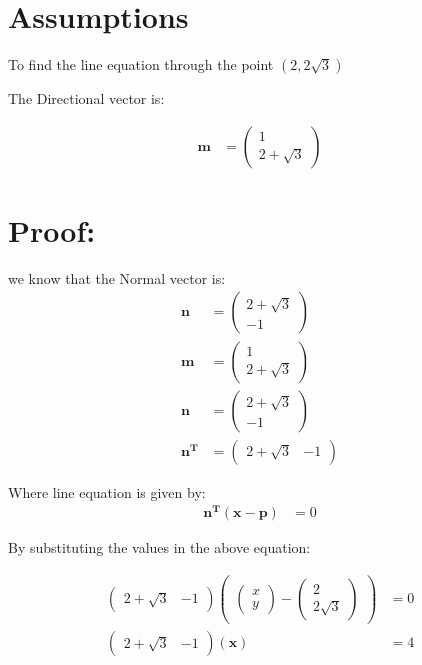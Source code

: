 \documentclass[journal,10pt,twocolumn]{article}
\let\vec\mathbf
\newcommand{\myvec}[1]{\ensuremath{\begin{pmatrix}#1\end{pmatrix}}}
\begin{document}
\section{Assumptions}
To find the line equation  through the point $(2,2\sqrt{3})$
\vspace*{3mm}

 The Directional vector is:

\begin{align}
	\vec{m}&=\myvec{1\\2+\sqrt{3}}
\end{align}
  
\section{Proof:}
we know that the Normal vector is:
\begin{align}
	\vec{n}&=\myvec{2+\sqrt{3}\\-1}\\
	\vec{m}&=\myvec{1\\2+\sqrt{3}}\\
	\vec{n}&=\myvec{2+\sqrt{3}\\-1}\\
	\vec{n^T}&=\myvec{2+\sqrt{3}&-1}	
\end{align}






Where line equation  is given by:
\begin{align}
	\vec{n^T(x-p)}&=0
\end{align}

By substituting the values in the above equation:



\begin{align}
	\myvec{2+\sqrt{3} &-1}\myvec{\myvec{x\\y}-\myvec{2\\2\sqrt{3}}}&=0\\
	\myvec{2+\sqrt{3}&-1}\vec{(x)}&=4
\end{align}
\end{document}
